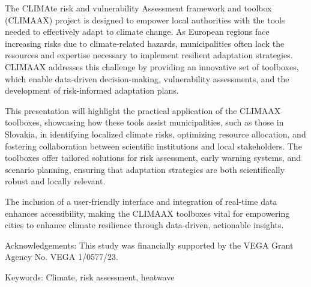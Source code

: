 The CLIMAte risk and vulnerability Assessment framework and toolbox (CLIMAAX) project is designed to empower local authorities with the tools needed to effectively adapt to climate change. As European regions face increasing risks due to climate-related hazards, municipalities often lack the resources and expertise necessary to implement resilient adaptation strategies. CLIMAAX addresses this challenge by providing an innovative set of toolboxes, which enable data-driven decision-making, vulnerability assessments, and the development of risk-informed adaptation plans.

This presentation will highlight the practical application of the CLIMAAX toolboxes, showcasing how these tools assist municipalities, such as those in Slovakia, in identifying localized climate risks, optimizing resource allocation, and fostering collaboration between scientific institutions and local stakeholders. The toolboxes offer tailored solutions for risk assessment, early warning systems, and scenario planning, ensuring that adaptation strategies are both scientifically robust and locally relevant.

The inclusion of a user-friendly interface and integration of real-time data enhances accessibility, making the CLIMAAX toolboxes vital for empowering cities to enhance climate resilience through data-driven, actionable insights.

Acknowledgements: This study was financially supported by the VEGA Grant Agency No. VEGA 1/0577/23.

Keywords: Climate, risk assessment, heatwave
\newpage{}
{}
\begin{flushleft}





\end{flushleft}

